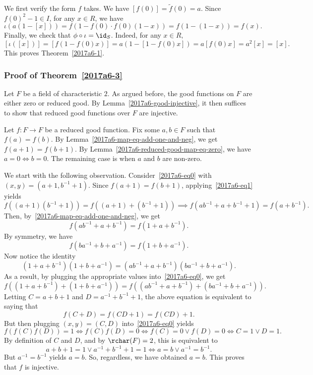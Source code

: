 We first verify the form $f$ takes.
We have $[f(0)] = \tilde{f}(0) = a$.
Since $f(0)^2 - 1 \in I$, for any $x \in R$, we have
\[ \iota(a(1 - [x])) = f(1 - f(0) \cdot f(0) (1 - x)) = f(1 - (1 - x)) = f(x). \]
Finally, we check that $\phi \circ \iota = \id_S$.
Indeed, for any $x \in R$,
\[ [\iota([x])] = [f(1 - f(0) x)] = a(1 - [1 - f(0) x]) = a [f(0) x] = a^2 [x] = [x]. \]
This proves Theorem~\ref{2017a6-1}.



\subsubsection*{Proof of Theorem~\ref{2017a6-3}}

Let $F$ be a field of characteristic $2$.
As argued before, the good functions on $F$ are either zero or reduced good.
By Lemma~\ref{2017a6-good-injective}, it then suffices to show that reduced good functions over $F$ are injective.

Let $f : F \to F$ be a reduced good function.
Fix some $a, b \in F$ such that $f(a) = f(b)$.
By Lemma~\ref{2017a6-map-eq-add-one-and-neg}, we get $f(a + 1) = f(b + 1)$.
By Lemma~\ref{2017a6-reduced-good-map-eq-zero}, we have $a = 0 \iff b = 0$.
The remaining case is when $a$ and $b$ are non-zero.

We start with the following observation.
Consider~\eqref{2017a6-eq0} with $(x, y) = (a + 1, b^{-1} + 1)$.
Since $f(a + 1) = f(b + 1)$, applying~\eqref{2017a6-eq1} yields
\[ f((a + 1)(b^{-1} + 1)) = f((a + 1) + (b^{-1} + 1)) \implies f(ab^{-1} + a + b^{-1} + 1) = f(a + b^{-1}). \]
Then, by~\eqref{2017a6-map-eq-add-one-and-neg}, we get
\[ f(ab^{-1} + a + b^{-1}) = f(1 + a + b^{-1}). \]
By symmetry, we have
\[ f(ba^{-1} + b + a^{-1}) = f(1 + b + a^{-1}). \]
Now notice the identity
\[ (1 + a + b^{-1})(1 + b + a^{-1}) = (ab^{-1} + a + b^{-1})(ba^{-1} + b + a^{-1}). \]
As a result, by plugging the appropriate values into~\eqref{2017a6-eq0}, we get
\[ f((1 + a + b^{-1}) + (1 + b + a^{-1})) = f((ab^{-1} + a + b^{-1}) + (ba^{-1} + b + a^{-1})). \]
Letting $C = a + b + 1$ and $D = a^{-1} + b^{-1} + 1$, the above equation is equivalent to saying that
\[ f(C + D) = f(CD + 1) = f(CD) + 1. \]
But then plugging $(x, y) = (C, D)$ into~\eqref{2017a6-eq0} yields
\[ f(f(C) f(D)) = 1 \iff f(C) f(D) = 0 \iff f(C) = 0 \vee f(D) = 0 \iff C = 1 \vee D = 1. \]
By definition of $C$ and $D$, and by $\rchar(F) = 2$, this is equivalent to
\[ a + b + 1 = 1 \vee a^{-1} + b^{-1} + 1 = 1 \iff a = b \vee a^{-1} = b^{-1}. \]
But $a^{-1} = b^{-1}$ yields $a = b$.
So, regardless, we have obtained $a = b$.
This proves that $f$ is injective.
